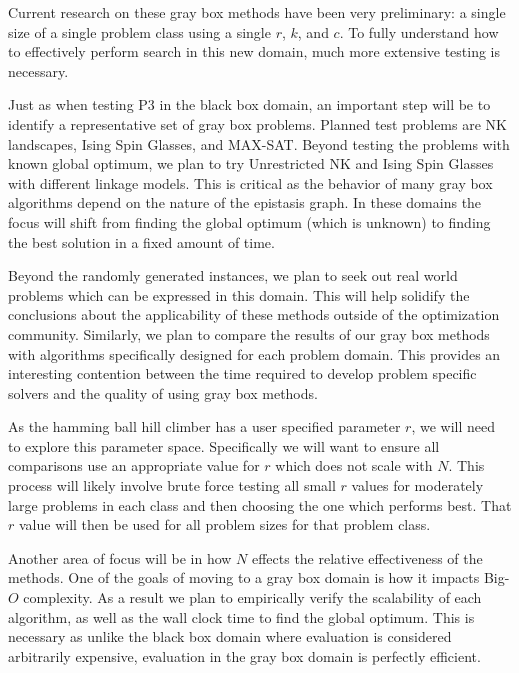 Current research on these gray box methods have been very preliminary: a single size of a single problem class using
a single $r$, $k$, and $c$. To fully understand how to effectively perform search in this new domain, much more extensive testing
is necessary.

Just as when testing P3 in the black box domain, an important step will be to identify a representative set
of gray box problems. Planned test problems are NK landscapes, Ising Spin Glasses, and MAX-SAT. Beyond testing the
problems with known global optimum, we plan to try Unrestricted NK and Ising Spin Glasses with different linkage models.
This is critical as the behavior of many gray box algorithms depend on the nature of the epistasis graph. In these domains
the focus will shift from finding the global optimum (which is unknown) to finding the best solution in a fixed amount of time.

Beyond the randomly generated instances, we plan to seek out real world problems which can be expressed in this domain.
This will help solidify the conclusions about the applicability of these methods outside of the optimization community.
Similarly, we plan to compare the results of our gray box methods with algorithms specifically designed for each problem
domain. This provides an interesting contention between the time required to develop problem specific solvers and the
quality of using gray box methods.

As the hamming ball hill climber has a user specified parameter $r$, we will need to explore this parameter space.
Specifically we will want to ensure all comparisons use an appropriate value for $r$ which does not scale with
$N$. This process will likely involve brute force testing all small $r$ values for moderately large problems in each class
and then choosing the one which performs best. That $r$ value will then be used for all problem sizes for that problem class.

Another area of focus will be in how $N$ effects the relative effectiveness of the methods. One of the goals of moving
to a gray box domain is how it impacts Big-$O$ complexity. As a result we plan to empirically verify the scalability
of each algorithm, as well as the wall clock time to find the global optimum. This is necessary as unlike the black box
domain where evaluation is considered arbitrarily expensive, evaluation in the gray box domain is perfectly efficient.
